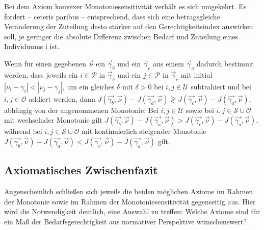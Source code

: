 \documentclass[a4paper]{thesis}
\begin{document}
Bei dem Axiom konvexer Monotoniesensitivität verhält es sich umgekehrt. Es fordert -- ceteris paribus -- entsprechend, dass sich eine betragsgleiche Veränderung der Zuteilung desto stärker auf den Gerechtigkeitsindex auswirken soll, je geringer die absolute Differenz zwischen Bedarf und Zuteilung eines Individuums i ist.

\begin{Axiom}
Wenn für einen gegebenen $\vec\nu$ ein $\vec\gamma_b$ und ein $\vec\gamma_c$ aus einem $\vec\gamma_a$ dadurch bestimmt werden, dass jeweils ein $i\in\mathcal{P}$ in $\vec\gamma_b$ und ein $j\in\mathcal{P}$ in $\vec\gamma_c$ mit initial $|\nu_i-\gamma_i|<|\nu_j-\gamma_j|$, um ein gleiches $\delta$ mit $\delta>0$ bei $i,j\in\mathcal{U}$ subtrahiert und bei $i,j\in\mathcal{O}$ addiert werden, dann $J(\vec{\gamma_b},\vec{\nu})-J(\vec{\gamma_a},\vec{\nu})\gtrless J(\vec{\gamma_c},\vec{\nu})-J(\vec{\gamma_a},\vec{\nu})$, abhängig von der angenommenen Monotonie: Bei $i,j\in\mathcal{U}$ sowie bei $i,j\in\mathcal{S}\cup\mathcal{O}$ mit wechselnder Monotonie gilt $J(\vec{\gamma_b},\vec{\nu})-J(\vec{\gamma_a},\vec{\nu})>J(\vec{\gamma_c},\vec{\nu})-J(\vec{\gamma_a},\vec{\nu})$, während bei $i,j\in\mathcal{S}\cup\mathcal{O}$ mit kontinuierlich steigender Monotonie $J(\vec{\gamma_b},\vec{\nu})-J(\vec{\gamma_a},\vec{\nu})<J(\vec{\gamma_c},\vec{\nu})-J(\vec{\gamma_a},\vec{\nu})$ gilt.
\end{Axiom}

\subsection{Axiomatisches Zwischenfazit}
Augenscheinlich schließen sich jeweils die beiden möglichen Axiome im Rahmen der Monotonie sowie im Rahmen der Monotoniesensitivität gegenseitig aus. Hier wird die Notwendigkeit deutlich, eine Auswahl zu treffen: Welche Axiome sind für ein Maß der Bedarfsgerechtigkeit aus normativer Perspektive wünschenswert?
\end{document}

